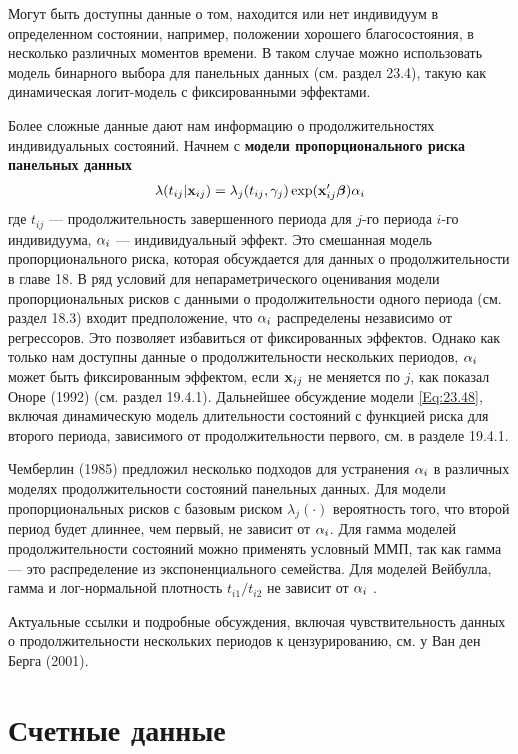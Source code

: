 Могут быть доступны данные о том, находится или нет индивидуум в определенном состоянии, например, положении хорошего благосостояния, в несколько различных моментов времени.  В таком случае можно использовать модель бинарного выбора для панельных данных (см. раздел 23.4), такую как динамическая логит-модель с фиксированными эффектами.

Более сложные данные дают нам информацию о продолжительностях индивидуальных состояний. Начнем с \textbf{модели пропорционального риска панельных данных}
\begin{align}
\lambda (t_{ij} | \mathbf{x}_{ij}) = \lambda_j (t_{ij}, \gamma_j) \exp (\mathbf{x}'_{ij} \bm{\beta}) \alpha_i 
\label{Eq:23.48}
\end{align}
где $t_{ij}$ --- продолжительность завершенного периода для $j$-го периода $i$-го индивидуума, $\alpha_i$ --- индивидуальный эффект. Это смешанная модель пропорционального риска, которая обсуждается для данных о продолжительности в главе 18. В ряд условий для непараметрического оценивания модели пропорциональных рисков с данными о продолжительности одного периода (см. раздел 18.3) входит предположение, что $\alpha_i$ распределены независимо от регрессоров. Это позволяет избавиться от фиксированных эффектов. Однако как только нам доступны данные о продолжительности нескольких периодов, $\alpha_i$ может быть фиксированным эффектом, если $\mathbf{x}_{ij}$ не меняется по $j$, как показал  Оноре (1992) (см. раздел 19.4.1). Дальнейшее обсуждение модели \ref{Eq:23.48}, включая динамическую модель длительности состояний с функцией риска для второго периода, зависимого от продолжительности первого, см. в разделе 19.4.1.

Чемберлин (1985) предложил несколько подходов для устранения $\alpha_i$ в различных моделях продолжительности состояний панельных данных. Для модели пропорциональных рисков с базовым риском $\lambda_j(\cdot)$ вероятность того, что второй период будет длиннее, чем первый, не зависит от $\alpha_i$. Для гамма моделей продолжительности состояний можно применять условный ММП, так как гамма --- это распределение из экспоненциального семейства. Для моделей Вейбулла, гамма и лог-нормальной плотность $t_{i1}/t_{i2}$ не зависит от $\alpha_i$ .

Актуальные ссылки и подробные обсуждения, включая чувствительность данных о продолжительности нескольких периодов к цензурированию, см. у Ван ден Берга (2001).

\section{Счетные данные}

